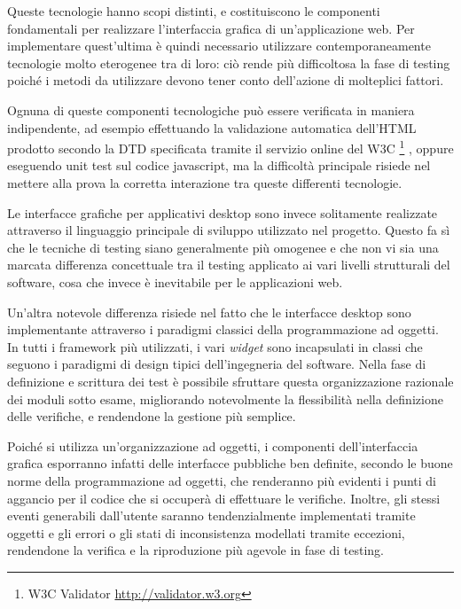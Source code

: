 
Queste tecnologie hanno scopi distinti, e costituiscono le componenti fondamentali per realizzare l'interfaccia grafica di un'applicazione web. Per implementare quest'ultima è quindi necessario utilizzare contemporaneamente tecnologie molto eterogenee tra di loro: ciò rende più difficoltosa la fase di testing poiché i metodi da utilizzare devono tener conto dell'azione di molteplici fattori. 

Ognuna di queste componenti tecnologiche può essere verificata in maniera indipendente, ad esempio effettuando la validazione automatica dell'HTML prodotto secondo la DTD specificata tramite il servizio online del W3C \footnote{W3C Validator \url{http://validator.w3.org}} , oppure eseguendo unit test sul codice javascript, ma la difficoltà principale risiede nel mettere alla prova la corretta interazione tra queste differenti tecnologie. 

Le interfacce grafiche per applicativi desktop sono invece solitamente realizzate attraverso il linguaggio principale di sviluppo utilizzato nel progetto. Questo fa sì che le tecniche di testing siano generalmente più omogenee e che non vi sia una marcata differenza concettuale tra il testing applicato ai vari livelli strutturali del software, cosa che invece è inevitabile per le applicazioni web.

Un'altra notevole differenza risiede nel fatto che le interfacce desktop sono implementante attraverso i paradigmi classici della programmazione ad oggetti. In tutti i framework più utilizzati, i vari \emph{widget} sono incapsulati in classi che seguono i paradigmi di design tipici dell'ingegneria del software. Nella fase di definizione e scrittura dei test è possibile sfruttare questa organizzazione razionale dei moduli sotto esame, migliorando notevolmente la flessibilità nella definizione delle verifiche, e rendendone la gestione più semplice. 

Poiché si utilizza un'organizzazione ad oggetti, i componenti dell'interfaccia grafica esporranno infatti delle interfacce pubbliche ben definite, secondo le buone norme della programmazione ad oggetti, che renderanno più evidenti i punti di aggancio per il codice che si occuperà di effettuare le verifiche. Inoltre, gli stessi eventi generabili dall'utente saranno tendenzialmente implementati tramite oggetti e gli errori o gli stati di inconsistenza modellati tramite eccezioni, rendendone la verifica e la riproduzione più agevole in fase di testing.

